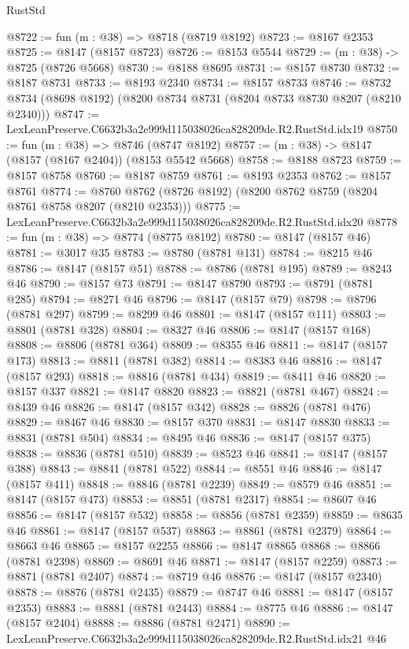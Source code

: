 \begin{lexlean}{RustStd}
\begin{coremodule}
@8722 := fun (m : @38) => @8718 (@8719 @8192)
@8723 := @8167 @2353
@8725 := @8147 (@8157 @8723)
@8726 := @8153 @5544
@8729 := (m : @38) -> @8725 (@8726 @5668)
@8730 := @8188 @8695
@8731 := @8157 @8730
@8732 := @8187 @8731
@8733 := @8193 @2340
@8734 := @8157 @8733
@8746 := @8732 @8734 (@8698 @8192) (@8200 @8734 @8731 (@8204 @8733 @8730 @8207 (@8210 @2340)))
@8747 := LexLeanPreserve.C6632b3a2e999d115038026ca828209de.R2.RustStd.idx19
@8750 := fun (m : @38) => @8746 (@8747 @8192)
@8757 := (m : @38) -> @8147 (@8157 (@8167 @2404)) (@8153 @5542 @5668)
@8758 := @8188 @8723
@8759 := @8157 @8758
@8760 := @8187 @8759
@8761 := @8193 @2353
@8762 := @8157 @8761
@8774 := @8760 @8762 (@8726 @8192) (@8200 @8762 @8759 (@8204 @8761 @8758 @8207 (@8210 @2353)))
@8775 := LexLeanPreserve.C6632b3a2e999d115038026ca828209de.R2.RustStd.idx20
@8778 := fun (m : @38) => @8774 (@8775 @8192)
@8780 := @8147 (@8157 @46)
@8781 := @3017 @35
@8783 := @8780 (@8781 @131)
@8784 := @8215 @46
@8786 := @8147 (@8157 @51)
@8788 := @8786 (@8781 @195)
@8789 := @8243 @46
@8790 := @8157 @73
@8791 := @8147 @8790
@8793 := @8791 (@8781 @285)
@8794 := @8271 @46
@8796 := @8147 (@8157 @79)
@8798 := @8796 (@8781 @297)
@8799 := @8299 @46
@8801 := @8147 (@8157 @111)
@8803 := @8801 (@8781 @328)
@8804 := @8327 @46
@8806 := @8147 (@8157 @168)
@8808 := @8806 (@8781 @364)
@8809 := @8355 @46
@8811 := @8147 (@8157 @173)
@8813 := @8811 (@8781 @382)
@8814 := @8383 @46
@8816 := @8147 (@8157 @293)
@8818 := @8816 (@8781 @434)
@8819 := @8411 @46
@8820 := @8157 @337
@8821 := @8147 @8820
@8823 := @8821 (@8781 @467)
@8824 := @8439 @46
@8826 := @8147 (@8157 @342)
@8828 := @8826 (@8781 @476)
@8829 := @8467 @46
@8830 := @8157 @370
@8831 := @8147 @8830
@8833 := @8831 (@8781 @504)
@8834 := @8495 @46
@8836 := @8147 (@8157 @375)
@8838 := @8836 (@8781 @510)
@8839 := @8523 @46
@8841 := @8147 (@8157 @388)
@8843 := @8841 (@8781 @522)
@8844 := @8551 @46
@8846 := @8147 (@8157 @411)
@8848 := @8846 (@8781 @2239)
@8849 := @8579 @46
@8851 := @8147 (@8157 @473)
@8853 := @8851 (@8781 @2317)
@8854 := @8607 @46
@8856 := @8147 (@8157 @532)
@8858 := @8856 (@8781 @2359)
@8859 := @8635 @46
@8861 := @8147 (@8157 @537)
@8863 := @8861 (@8781 @2379)
@8864 := @8663 @46
@8865 := @8157 @2255
@8866 := @8147 @8865
@8868 := @8866 (@8781 @2398)
@8869 := @8691 @46
@8871 := @8147 (@8157 @2259)
@8873 := @8871 (@8781 @2407)
@8874 := @8719 @46
@8876 := @8147 (@8157 @2340)
@8878 := @8876 (@8781 @2435)
@8879 := @8747 @46
@8881 := @8147 (@8157 @2353)
@8883 := @8881 (@8781 @2443)
@8884 := @8775 @46
@8886 := @8147 (@8157 @2404)
@8888 := @8886 (@8781 @2471)
@8890 := LexLeanPreserve.C6632b3a2e999d115038026ca828209de.R2.RustStd.idx21 @46

\end{coremodule}
\end{lexlean}
